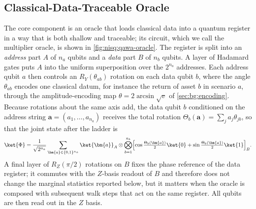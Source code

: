 \subsection{Classical-Data-Traceable Oracle}\label{sec:nisq:oracle}

The core component is an oracle that loads classical data into a quantum register in a way that is both shallow and traceable; its circuit, which we call the multiplier oracle, is shown in \cref{fig:nisq:qawa-oracle}. The register is split into an \emph{address} part $A$ of $n_{a}$ qubits and a \emph{data} part $B$ of $n_{b}$ qubits. A layer of Hadamard gates puts $A$ into the uniform superposition over the $2^{n_{a}}$ addresses. Each address qubit $a$ then controls an $R_{Y}(\theta_{ab})$ rotation on each data qubit $b$, where the angle $\theta_{ab}$ encodes one classical datum, for instance the return of asset $b$ in scenario $a$, through the amplitude-encoding map $\theta=2\arcsin\sqrt{v}$ of \cref{sec:bg:encoding}. Because rotations about the same axis add, the data qubit $b$ conditioned on the address string $\bm{a}=(a_{1},\dots,a_{n_{a}})$ receives the total rotation $\Theta_{b}(\bm{a})=\sum_{j}a_{j}\theta_{jb}$, so that the joint state after the ladder is
\begin{equation}\label{eq:nisq:oracle-state}
  \ket{\Phi} = \frac{1}{\sqrt{2^{n_{a}}}}\sum_{\bm{a}\in\{0,1\}^{n_{a}}} \ket{\bm{a}}_{A}\otimes\bigotimes_{b=1}^{n_{b}}
  \Bigl[\cos\tfrac{\Theta_{b}(\bm{a})}{2}\ket{0}+\sin\tfrac{\Theta_{b}(\bm{a})}{2}\ket{1}\Bigr]_{B}.
\end{equation}
A final layer of $R_{Z}(\pi/2)$ rotations on $B$ fixes the phase reference of the data register; it commutes with the $Z$-basis readout of $B$ and therefore does not change the marginal statistics reported below, but it matters when the oracle is composed with subsequent walk steps that act on the same register. All qubits are then read out in the $Z$ basis.

